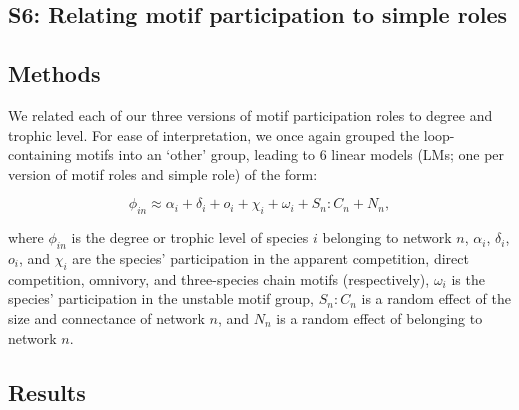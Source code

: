 \documentclass[12pt]{article}
\begin{document}
\begin{spacing}{2.0}
\clearpage


\section*{S6: Relating motif participation to simple roles}

	\subsection*{Methods}

		We related each of our three versions of motif participation roles to degree and trophic level.
        For ease of interpretation, we once again grouped the loop-containing motifs into an `other' group, leading to 6 linear models (LMs; one per version of motif roles and simple role) of the form:

        \begin{equation}
            \phi_{in} \approx \alpha_{i} + \delta_{i} + o_{i} + \chi_{i} + \omega_{i} + S_{n}:C_{n} + N_n,
            \label{eq:degTL_motifs}
        \end{equation}

        \noindent where $\phi_{in}$ is the degree or trophic level of species $i$ belonging to network $n$, $\alpha_{i}$, $\delta_{i}$, $o_{i}$, and $\chi_{i}$ are the species' participation in the apparent competition, direct competition, omnivory, and three-species chain motifs (respectively), $\omega_{i}$ is the species' participation in the unstable motif group, $S_{n}:C_{n}$ is a random effect of the size and connectance of network $n$, and $N_n$ is a random effect of belonging to network $n$.

	\subsection*{Results}


\end{spacing}
\end{document}
